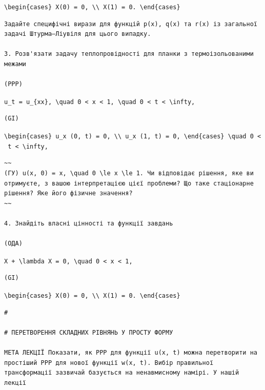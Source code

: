\documentclass[
  ukrainian,
]{article}
\begin{document}
\texttt{\textbackslash{}begin\{cases\}\ X(0)\ =\ 0,\ \textbackslash{}\textbackslash{}\ X\textquotesingle{}(1)\ =\ 0.\ \textbackslash{}end\{cases\}}

\begin{verbatim}
Задайте специфічні вирази для функцій p(x), q(x) та r(x) із загальної задачі Штурма–Ліувіля для цього випадку.

3. Розв'язати задачу теплопровідності для планки з термоізольованими межами

(PPP)
\end{verbatim}

\texttt{u\_t\ =\ u\_\{xx\},\ \textbackslash{}quad\ 0\ \textless{}\ x\ \textless{}\ 1,\ \textbackslash{}quad\ 0\ \textless{}\ t\ \textless{}\ \textbackslash{}infty,}

\begin{verbatim}
(GI)
\end{verbatim}

\texttt{\textbackslash{}begin\{cases\}\ u\_x\ (0,\ t)\ =\ 0,\ \textbackslash{}\textbackslash{}\ u\_x\ (1,\ t)\ =\ 0,\ \textbackslash{}end\{cases\}\ \textbackslash{}quad\ 0\ \textless{}\ t\ \textless{}\ \textbackslash{}infty,}

\begin{verbatim}
~~
(ГУ) u(x, 0) = x, \quad 0 \le x \le 1. Чи відповідає рішення, яке ви отримуєте, з вашою інтерпретацією цієї проблеми? Що таке стаціонарне рішення? Яке його фізичне значення?
~~

4. Знайдіть власні цінності та функції завдань

(ОДА)
\end{verbatim}

\texttt{X\textquotesingle{}\textquotesingle{}\ +\ \textbackslash{}lambda\ X\ =\ 0,\ \textbackslash{}quad\ 0\ \textless{}\ x\ \textless{}\ 1,}

\begin{verbatim}
(GI)
\end{verbatim}

\texttt{\textbackslash{}begin\{cases\}\ X\textquotesingle{}(0)\ =\ 0,\ \textbackslash{}\textbackslash{}\ X\textquotesingle{}(1)\ =\ 0.\ \textbackslash{}end\{cases\}}

\begin{verbatim}
#

# ПЕРЕТВОРЕННЯ СКЛАДНИХ РІВНЯНЬ У ПРОСТУ ФОРМУ

МЕТА ЛЕКЦІЇ Показати, як PPP для функції u(x, t) можна перетворити на простіший PPP для нової функції w(x, t). Вибір правильної трансформації зазвичай базується на ненавмисному намірі. У нашій лекції
\end{verbatim}
\end{document}
